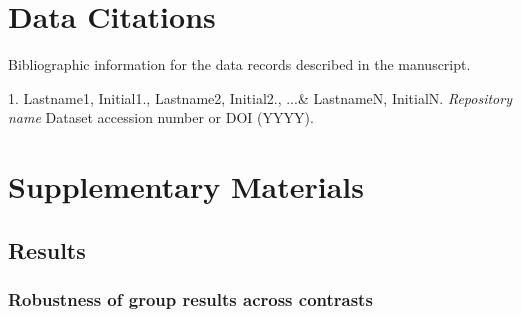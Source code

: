\documentclass[english]{article}
\begin{document}
%
%

\section{Data Citations}


Bibliographic information for the data records described in the manuscript.

1. Lastname1, Initial1., Lastname2, Initial2., ...\& LastnameN, InitialN. \emph{Repository name} Dataset accession number or DOI (YYYY).

\appendix

\section{Supplementary Materials}

\subsection{Results}

\subsubsection{Robustness of group results across contrasts}

\end{document}
